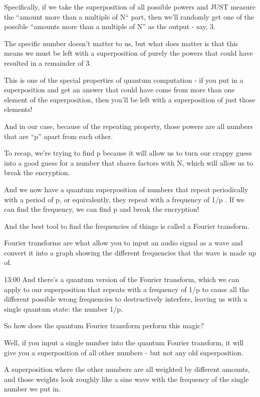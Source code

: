 \documentclass[../main.tex]{subfiles}
\begin{document}
Specifically, if we take the superposition of all possible powers and JUST measure the “amount more than a multiple of N“ part, then we’ll randomly get one of the possible “amounts more than a multiple of N” as the output - say, 3.

The specific number doesn’t matter to us, but what does matter is that this means we must be left with a superposition of purely the powers that could have resulted in a remainder of 3.

This is one of the special properties of quantum computation - if you put in a superposition and get an answer that could have come from more than one element of the superposition, then you'll be left with a superposition of just those elements!

And in our case, because of the repeating property, those powers are all numbers that are “p” apart from each other.

To recap, we’re trying to find p because it will allow us to turn our crappy guess into a good guess for a number that shares factors with N, which will allow us to break the encryption.

And we now have a quantum superposition of numbers that repeat periodically with a period of p, or equivalently, they repeat with a frequency of 1/p . If we can find the frequency, we can find p and break the encryption!

And the best tool to find the frequencies of things is called a Fourier transform.

Fourier transforms are what allow you to input an audio signal as a wave and convert it into a graph showing the different frequencies that the wave is made up of.

13:00	And there’s a quantum version of the Fourier transform, which we can apply to our superposition that repeats with a frequency of 1/p to cause all the different possible wrong frequencies to destructively interfere, leaving us with a single quantum state: the number 1/p.

So how does the quantum Fourier transform perform this magic?

Well, if you input a single number into the quantum Fourier transform, it will give you a superposition of all other numbers - but not any old superposition.

A superposition where the other numbers are all weighted by different amounts, and those weights look roughly like a sine wave with the frequency of the single number we put in.
\end{document}
